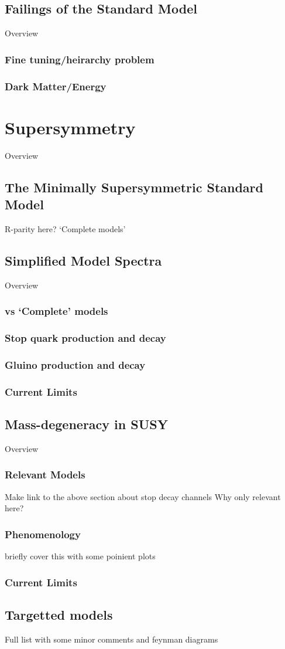 \subsection{Failings of the Standard Model}
Overview
\subsubsection{Fine tuning/heirarchy problem}
\subsubsection{Dark Matter/Energy}


\section{Supersymmetry}  %
\label{sec:theory_supersymmetry}
Overview

\subsection{The Minimally Supersymmetric Standard Model}
R-parity here?
`Complete models'

\subsection{Simplified Model Spectra}
Overview
\subsubsection{vs `Complete' models}
\subsubsection{Stop quark production and decay}
\subsubsection{Gluino production and decay}
\subsubsection{Current Limits}

\subsection{Mass-degeneracy in SUSY}
Overview
\subsubsection{Relevant Models}
Make link to the above section about stop decay channels
Why only relevant here?
\subsubsection{Phenomenology}
briefly cover this with some poinient plots
\subsubsection{Current Limits}

\subsection{Targetted models}
Full list with some minor comments and feynman diagrams
